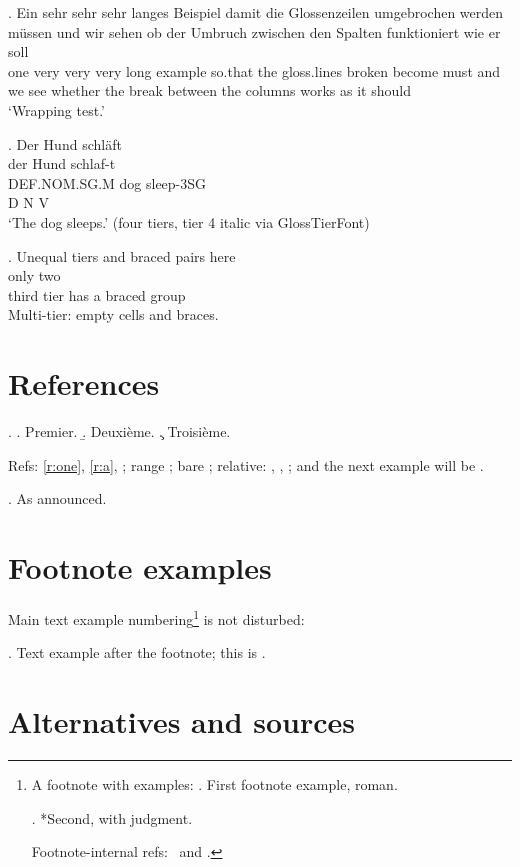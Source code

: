\documentclass{article}
\begin{document}
\ex. \gll Ein sehr sehr sehr langes Beispiel damit die Glossenzeilen
umgebrochen werden m\"ussen und wir sehen ob der Umbruch zwischen den
Spalten funktioniert wie er soll \\
one very very very long example so.that the gloss.lines broken
become must and we see whether the break between the columns
works as it should \\
\glt `Wrapping test.'

\ex. \gl Der Hund schl\"aft \\
     der Hund schlaf-t \\
     DEF.NOM.SG.M dog sleep-3SG \\
     D N V \\ \endgl
\glt `The dog sleeps.' (four tiers, tier 4 italic via GlossTierFont)

\ex. \gl Unequal tiers and {braced pairs} here \\
     only two \\
     third {tier has} a braced group \\ \endgl
\glt Multi-tier: empty cells and braces.

\section*{References}

\ex.\label{r:one}
\a. Premier.
\b. Deuxi\`eme.
\c. Troisi\`eme.

Refs: \ref{r:one}, \ref{r:a}, ; range ;
bare ; relative: \Last, \pLast, \LLast; and the next
example will be \Next.

\ex. As announced.

\section*{Footnote examples}

Main text example numbering\footnote{A footnote with examples:
\ex. First footnote example, roman.

\ex. *Second, with judgment.

Footnote-internal refs: \Last\ and \LLast.} is not disturbed:

\ex. Text example after the footnote; this is \Last.

\section*{Alternatives and sources}
\end{document}
